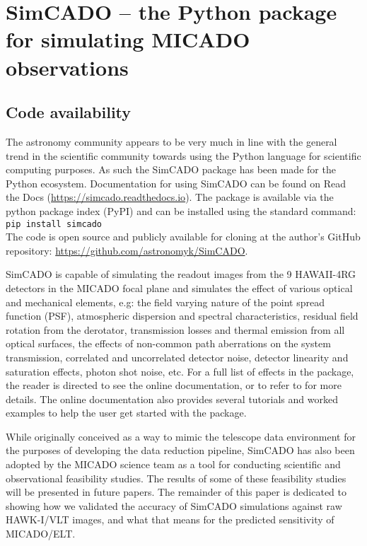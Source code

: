 \section{SimCADO -- the Python package for simulating MICADO observations}
\label{sec:simcado}


\subsection{Code availability}
\label{subsec:code_availablity}

The astronomy community appears to be very much in line with the general trend in the scientific community towards using the Python language for scientific computing purposes.
As such the SimCADO package has been made for the Python ecosystem. Documentation for using SimCADO can be found on Read the Docs (\url{https://simcado.readthedocs.io}).
The package is available via the python package index (PyPI) and can be installed using the standard command:\\

\verb+pip install simcado+\\

The code is open source and publicly available for cloning at the author's GitHub repository: \url{https://github.com/astronomyk/SimCADO}. 

SimCADO is capable of simulating the readout images from the 9 HAWAII-4RG detectors in the MICADO focal plane and simulates the effect of various optical and mechanical elements, e.g: the field varying nature of the point spread function (PSF), atmospheric dispersion and spectral characteristics, residual field rotation from the derotator, transmission losses and thermal emission from all optical surfaces, the effects of non-common path aberrations on the system transmission, correlated and uncorrelated detector noise, detector linearity and saturation effects, photon shot noise, etc.
For a full list of effects in the package, the reader is directed to see the online documentation, or to refer to \citet{leschinski2016} for more details.
The online documentation also provides several tutorials and worked examples to help the user get started with the package.

While originally conceived as a way to mimic the telescope data environment for the purposes of developing the data reduction pipeline, SimCADO has also been adopted by the MICADO science team as a tool for conducting scientific and observational feasibility studies.
The results of some of these feasibility studies will be presented in future papers.
The remainder of this paper is dedicated to showing how we validated the accuracy of SimCADO simulations against raw HAWK-I/VLT images, and what that means for the predicted sensitivity of MICADO/ELT.

